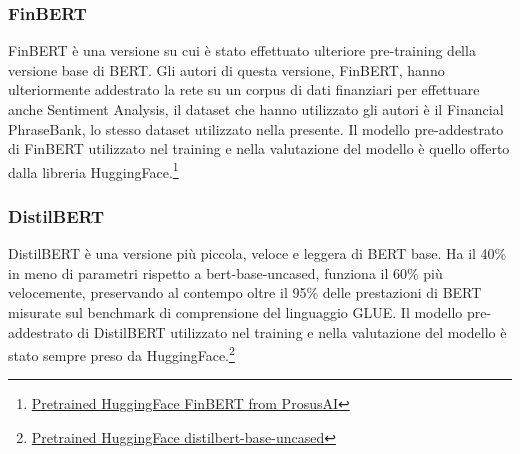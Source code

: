 \subsubsection{FinBERT}
FinBERT \cite{araci2019finbert} è una versione su cui è stato effettuato ulteriore pre-training della versione base di BERT. Gli autori di questa versione, FinBERT, hanno ulteriormente addestrato la rete su un corpus di dati finanziari per effettuare anche Sentiment Analysis, il dataset che hanno utilizzato gli autori è il Financial PhraseBank, lo stesso dataset utilizzato nella presente. 
Il modello pre-addestrato di FinBERT utilizzato nel training e nella valutazione del modello è quello offerto dalla libreria HuggingFace.\footnote{\href{https://huggingface.co/ProsusAI/finbert}{Pretrained HuggingFace FinBERT from ProsusAI}}  

    
\subsubsection{DistilBERT}
DistilBERT \cite{sanh2020distilbert} è una versione più piccola, veloce e leggera di BERT base. Ha il 40\% in meno di parametri rispetto a bert-base-uncased, funziona il 60\% più velocemente, preservando al contempo oltre il 95\% delle prestazioni di BERT misurate sul benchmark di comprensione del linguaggio GLUE. Il modello pre-addestrato di DistilBERT utilizzato nel training e nella valutazione del modello è stato sempre preso da HuggingFace.\footnote{\href{https://huggingface.co/distilbert-base-uncased}{Pretrained HuggingFace distilbert-base-uncased}}  




